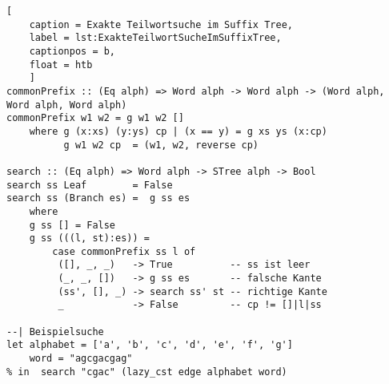 \documentclass[12pt]{report}
\begin{document}

\begin{lstlisting}[
    caption = Exakte Teilwortsuche im Suffix Tree,
    label = lst:ExakteTeilwortSucheImSuffixTree,
    captionpos = b,
    float = htb
    ]
commonPrefix :: (Eq alph) => Word alph -> Word alph -> (Word alph, Word alph, Word alph)
commonPrefix w1 w2 = g w1 w2 []
    where g (x:xs) (y:ys) cp | (x == y) = g xs ys (x:cp)
          g w1 w2 cp  = (w1, w2, reverse cp)

search :: (Eq alph) => Word alph -> STree alph -> Bool
search ss Leaf        = False
search ss (Branch es) =  g ss es
    where
    g ss [] = False
    g ss (((l, st):es)) =
        case commonPrefix ss l of
         ([], _, _)   -> True          -- ss ist leer
         (_, _, [])   -> g ss es       -- falsche Kante
         (ss', [], _) -> search ss' st -- richtige Kante
         _            -> False         -- cp != []|l|ss

--| Beispielsuche
let alphabet = ['a', 'b', 'c', 'd', 'e', 'f', 'g']
    word = "agcgacgag"
% in  search "cgac" (lazy_cst edge alphabet word)
\end{lstlisting}
\end{document}
